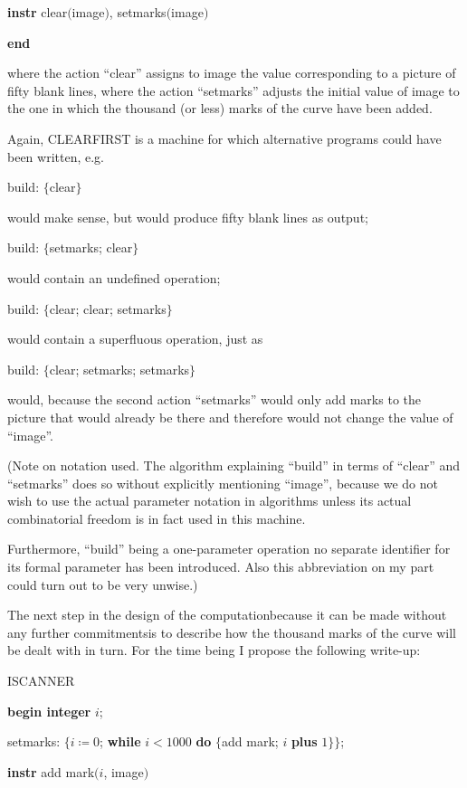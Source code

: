 \quad \textbf{instr} clear$($image$)$, setmarks$($image$)$

\textbf{end}

\noindent
where the action ``clear'' assigns to image the value corresponding to a picture of fifty blank lines, where the action ``setmarks'' adjusts the initial value of image to the one in which the thousand (or less) marks of the curve have been added.

Again, CLEARFIRST is a machine for which alternative programs could have been written, e.g.

build: $\{$clear$\}$

\noindent
would make sense, but would produce fifty blank lines as output;

build: $\{$setmarks; clear$\}$

\noindent
would contain an undefined operation;

build: $\{$clear; clear; setmarks$\}$

\noindent
would contain a superfluous operation, just as

build: $\{$clear; setmarks; setmarks$\}$

\noindent
would, because the second action ``setmarks'' would only add marks to the picture that would already be there and therefore would not change the value of ``image''.

(Note on notation used. The algorithm explaining ``build'' in terms of ``clear'' and ``setmarks'' does so without explicitly mentioning ``image'', because we do not wish to use the actual parameter notation in algorithms unless its actual combinatorial freedom is in fact used in this machine.

Furthermore, ``build'' being a one-parameter operation no separate identifier for its formal parameter has been introduced. Also this abbreviation on my part could turn out to be very unwise.)

The next step in the design of the computation\textemdash{}because it can be made without any further commitments\textemdash{}is to describe how the thousand marks of the curve will be dealt with in turn. For the time being I propose the following write-up:

ISCANNER

\textbf{begin integer} $i$;

\quad setmarks: $\{i \coloneq 0$; \textbf{while} $i < 1000$ \textbf{do} $\{$add mark; $i$ \textbf{plus} $1\}\}$;

\quad \textbf{instr} add mark$(i$, image$)$

